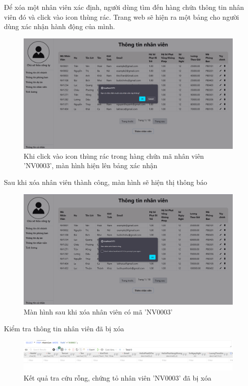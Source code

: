 Để xóa một nhân viên xác định, người dùng tìm đến hàng chứa thông tin nhân viên đó và click vào icon thùng rác. Trang web sẽ hiện ra một bảng cho người dùng xác nhận hành động của mình.
\begin{figure}[H]
    \centering
    \includegraphics[width=0.75\linewidth]{content/images/ManHinh_1_j.png}
    \caption{Khi click vào icon thùng rác trong hàng chứa mã nhân viên 'NV0003', màn hình hiện lên bảng xác nhận}
    \label{fig:ManHinh_1_j}
\end{figure}

Sau khi xóa nhân viên thành công, màn hình sẽ hiện thị thông báo
\begin{figure}[H]
    \centering
    \includegraphics[width=0.75\linewidth]{content/images/ManHinh_1_k.png}
    \caption{Màn hình sau khi xóa nhân viên có mã 'NV0003'}
    \label{fig:ManHinh_1_k}
\end{figure}

Kiểm tra thông tin nhân viên đã bị xóa
\begin{figure}[H]
    \centering
    \includegraphics[width=0.75\linewidth]{content/images/ManHinh_1_l.png}
    \caption{Kết quả tra cứu rỗng, chứng tỏ nhân viên 'NV0003' đã bị xóa}
    \label{fig:ManHinh_1_l}
\end{figure}

